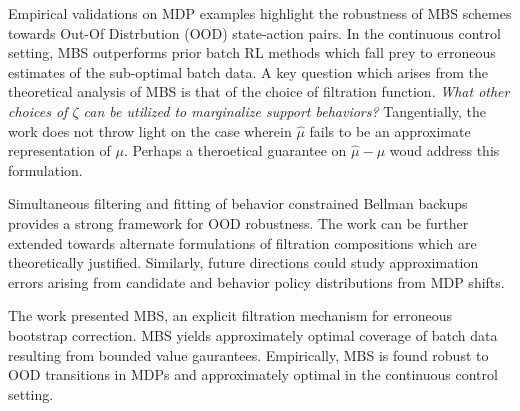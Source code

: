 \documentclass[11pt,letterpaper]{article}
\begin{document}
Empirical validations on MDP examples highlight the robustness of MBS schemes towards Out-Of Distrbution (OOD) state-action pairs. In the continuous control setting, MBS outperforms prior batch RL methods which fall prey to erroneous estimates of the sub-optimal batch data. A key question which arises from the theoretical analysis of MBS is that of the choice of filtration function. \textit{What other choices of $\zeta$ can be utilized to marginalize support behaviors?} Tangentially, the work does not throw light on the case wherein $\hat{\mu}$ fails to be an approximate representation of $\mu$. Perhaps a theroetical guarantee on $\hat{\mu} - \mu$ woud address this formulation.

Simultaneous filtering and fitting of behavior constrained Bellman backups provides a strong framework for OOD robustness. The work can be further extended towards alternate formulations of filtration compositions which are theoretically justified. Similarly, future directions could study approximation errors arising from candidate and behavior policy distributions from MDP shifts.

The work presented MBS, an explicit filtration mechanism for erroneous bootstrap correction. MBS yields approximately optimal coverage of batch data resulting from bounded value gaurantees. Empirically, MBS is found robust to OOD transitions in MDPs and approximately optimal in the continuous control setting.
\end{document}
